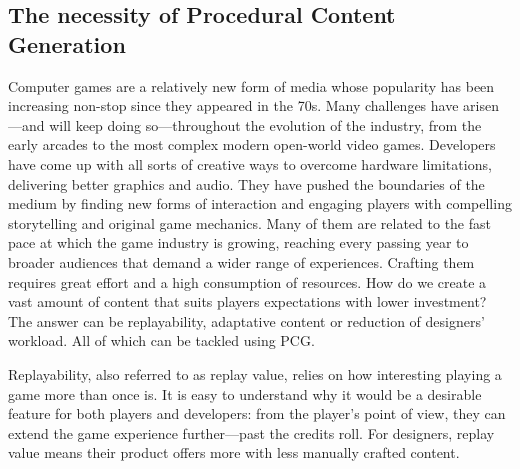 \subsection{The necessity of Procedural Content Generation}
Computer games are a relatively new form of media whose popularity has been increasing non-stop since they appeared in the 70s. Many challenges have arisen---and will keep doing so---throughout the evolution of the industry, from the early arcades to the most complex modern open-world video games. Developers have come up with all sorts of creative ways to overcome hardware limitations, delivering better graphics and audio. They have pushed the boundaries of the medium by finding new forms of interaction and engaging players with compelling storytelling and original game mechanics. Many of them are related to the fast pace at which the game industry is growing, reaching every passing year to broader audiences that demand a wider range of experiences. Crafting them requires great effort and a high consumption of resources. How do we create a vast amount of content that suits players expectations with lower investment? The answer can be replayability, adaptative content or reduction of designers' workload. All of which can be tackled using PCG.\cite{togelius2016introduction}





Replayability, also referred to as replay value, relies on how interesting playing a game more than once is. It is easy to understand why it would be a desirable feature for both players and developers: from the player's point of view, they can extend the game experience further---past the credits roll. For designers, replay value means their product offers more with less manually crafted content.

